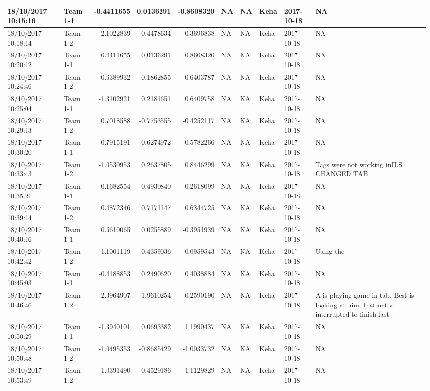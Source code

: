 \documentclass[]{article}
\begin{document}
\begin{tabular}{l|l|r|r|r|l|l|l|l|l}
\hline
18/10/2017 10:15:16 & Team 1-1 & -0.4411655 & 0.0136291 & -0.8608320 & NA & NA & Keha & 2017-10-18 & NA\\
\hline
18/10/2017 10:18:14 & Team 1-2 & 2.1022839 & 0.4478634 & 0.3696838 & NA & NA & Keha & 2017-10-18 & NA\\
\hline
18/10/2017 10:20:12 & Team 1-1 & -0.4411655 & 0.0136291 & -0.8608320 & NA & NA & Keha & 2017-10-18 & NA\\
\hline
18/10/2017 10:24:46 & Team 1-2 & 0.6389932 & -0.1862855 & 0.6403787 & NA & NA & Keha & 2017-10-18 & NA\\
\hline
18/10/2017 10:25:04 & Team 1-1 & -1.3102921 & 0.2181651 & 0.6409758 & NA & NA & Keha & 2017-10-18 & NA\\
\hline
18/10/2017 10:29:13 & Team 1-2 & 0.7018588 & -0.7753555 & -0.4252117 & NA & NA & Keha & 2017-10-18 & NA\\
\hline
18/10/2017 10:30:20 & Team 1-1 & -0.7915191 & -0.6274972 & 0.5782266 & NA & NA & Keha & 2017-10-18 & NA\\
\hline
18/10/2017 10:33:43 & Team 1-2 & -1.0530953 & 0.2637805 & 0.8446299 & NA & NA & Keha & 2017-10-18 & Tags were not working inILS
CHANGED TAB\\
\hline
18/10/2017 10:35:21 & Team 1-1 & -0.1682554 & -0.4930840 & -0.2618099 & NA & NA & Keha & 2017-10-18 & NA\\
\hline
18/10/2017 10:39:14 & Team 1-2 & 0.4872346 & 0.7171147 & 0.6344725 & NA & NA & Keha & 2017-10-18 & NA\\
\hline
18/10/2017 10:40:16 & Team 1-1 & 0.5610065 & 0.0255889 & -0.3951939 & NA & NA & Keha & 2017-10-18 & NA\\
\hline
18/10/2017 10:42:42 & Team 1-2 & 1.1001119 & 0.4359036 & -0.0959543 & NA & NA & Keha & 2017-10-18 & Using the\\
\hline
18/10/2017 10:45:03 & Team 1-1 & -0.4188853 & 0.2490620 & 0.4038884 & NA & NA & Keha & 2017-10-18 & NA\\
\hline
18/10/2017 10:46:46 & Team 1-2 & 2.3964907 & 1.9610254 & -0.2590190 & NA & NA & Keha & 2017-10-18 & A is playing game in tab. Best is looking at him. Instructor interrupted to finish fast\\
\hline
18/10/2017 10:50:29 & Team 1-1 & -1.3940101 & 0.0693382 & 1.1990437 & NA & NA & Keha & 2017-10-18 & NA\\
\hline
18/10/2017 10:50:48 & Team 1-2 & -1.0495353 & -0.8685429 & -1.0033732 & NA & NA & Keha & 2017-10-18 & NA\\
\hline
18/10/2017 10:53:49 & Team 1-2 & -1.0391490 & -0.4529186 & -1.1129829 & NA & NA & Keha & 2017-10-18 & NA\\

\end{tabular}
\end{document}
